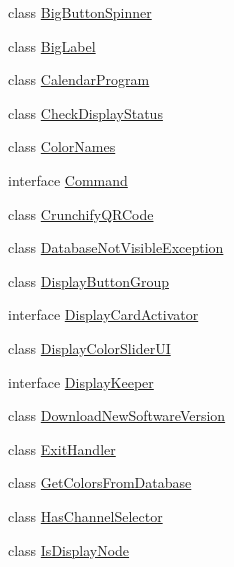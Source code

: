 \begin{DoxyCompactItemize}
\item 
class \hyperlink{classgov_1_1fnal_1_1ppd_1_1dd_1_1util_1_1BigButtonSpinner}{Big\-Button\-Spinner}
\item 
class \hyperlink{classgov_1_1fnal_1_1ppd_1_1dd_1_1util_1_1BigLabel}{Big\-Label}
\item 
class \hyperlink{classgov_1_1fnal_1_1ppd_1_1dd_1_1util_1_1CalendarProgram}{Calendar\-Program}
\item 
class \hyperlink{classgov_1_1fnal_1_1ppd_1_1dd_1_1util_1_1CheckDisplayStatus}{Check\-Display\-Status}
\item 
class \hyperlink{classgov_1_1fnal_1_1ppd_1_1dd_1_1util_1_1ColorNames}{Color\-Names}
\item 
interface \hyperlink{interfacegov_1_1fnal_1_1ppd_1_1dd_1_1util_1_1Command}{Command}
\item 
class \hyperlink{classgov_1_1fnal_1_1ppd_1_1dd_1_1util_1_1CrunchifyQRCode}{Crunchify\-Q\-R\-Code}
\item 
class \hyperlink{classgov_1_1fnal_1_1ppd_1_1dd_1_1util_1_1DatabaseNotVisibleException}{Database\-Not\-Visible\-Exception}
\item 
class \hyperlink{classgov_1_1fnal_1_1ppd_1_1dd_1_1util_1_1DisplayButtonGroup}{Display\-Button\-Group}
\item 
interface \hyperlink{interfacegov_1_1fnal_1_1ppd_1_1dd_1_1util_1_1DisplayCardActivator}{Display\-Card\-Activator}
\item 
class \hyperlink{classgov_1_1fnal_1_1ppd_1_1dd_1_1util_1_1DisplayColorSliderUI}{Display\-Color\-Slider\-U\-I}
\item 
interface \hyperlink{interfacegov_1_1fnal_1_1ppd_1_1dd_1_1util_1_1DisplayKeeper}{Display\-Keeper}
\item 
class \hyperlink{classgov_1_1fnal_1_1ppd_1_1dd_1_1util_1_1DownloadNewSoftwareVersion}{Download\-New\-Software\-Version}
\item 
class \hyperlink{classgov_1_1fnal_1_1ppd_1_1dd_1_1util_1_1ExitHandler}{Exit\-Handler}
\item 
class \hyperlink{classgov_1_1fnal_1_1ppd_1_1dd_1_1util_1_1GetColorsFromDatabase}{Get\-Colors\-From\-Database}
\item 
class \hyperlink{classgov_1_1fnal_1_1ppd_1_1dd_1_1util_1_1HasChannelSelector}{Has\-Channel\-Selector}
\item 
class \hyperlink{classgov_1_1fnal_1_1ppd_1_1dd_1_1util_1_1IsDisplayNode}{Is\-Display\-Node}
\item 

\end{DoxyCompactItemize}
